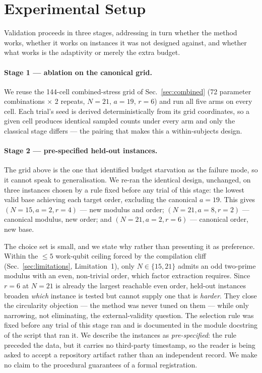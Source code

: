 \section{Experimental Setup}
\label{sec:design}

Validation proceeds in three stages, addressing in turn whether the
method works, whether it works on instances it was not designed against,
and whether what works is the adaptivity or merely the extra budget.

\paragraph{Stage 1 --- ablation on the canonical grid.} We reuse the
144-cell combined-stress grid of Sec.~\ref{sec:combined} (72 parameter
combinations $\times$ 2 repeats, $N=21$, $a=19$, $r=6$) and run all five
arms on every cell. Each trial's seed is derived deterministically from
its grid coordinates, so a given cell produces identical sampled counts
under every arm and only the classical stage differs --- the pairing that
makes this a within-subjects design.

\paragraph{Stage 2 --- pre-specified held-out instances.} The grid above
is the one that identified budget starvation as the failure mode, so it
cannot speak to generalisation. We re-ran the identical design, unchanged,
on three instances chosen by a rule fixed before any trial of this stage:
the lowest valid base achieving each target order, excluding the
canonical $a=19$. This gives $(N{=}15,a{=}2,r{=}4)$ --- new modulus and
order; $(N{=}21,a{=}8,r{=}2)$ --- canonical modulus, new order; and
$(N{=}21,a{=}2,r{=}6)$ --- canonical order, new base.

The choice set is small, and we state why rather than presenting it as
preference. Within the ${\le}5$ work-qubit ceiling forced by the
compilation cliff (Sec.~\ref{sec:limitations}, Limitation~1), only
$N\in\{15,21\}$ admits an odd two-prime modulus with an even, non-trivial
order, which factor extraction requires. Since $r=6$ at $N=21$ is already
the largest reachable even order, held-out instances broaden \emph{which}
instance is tested but cannot supply one that is \emph{harder}. They
close the circularity objection --- the method was never tuned on them ---
while only narrowing, not eliminating, the external-validity question.
The selection rule was fixed before any trial of this stage ran and is
documented in the module docstring of the script that ran it. We describe
the instances as \emph{pre-specified}: the rule preceded the data, but
it carries no third-party timestamp, so the reader is being asked to
accept a repository artifact rather than an independent record. We make
no claim to the procedural guarantees of a formal registration.

